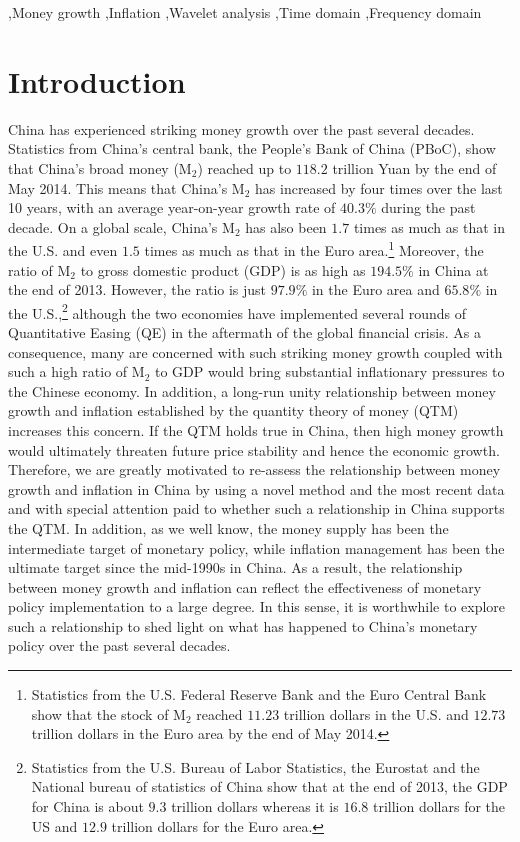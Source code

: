 \documentclass[a4paper,fleqn]{cas-sc}
\begin{document}
\begin{keywords}
    \sep Money growth
    \sep Inflation
    \sep Wavelet analysis
    \sep Time domain
    \sep Frequency domain 
\end{keywords}

\maketitle

\section{Introduction}
China has experienced striking money growth over the past several decades. Statistics from China's central bank, the People's Bank of China (PBoC), show that China's broad money (M$_2$) reached up to $118.2$ trillion Yuan by the end of May 2014. This means that China's M$_2$ has increased by four times over the last 10 years, with an average year-on-year growth rate of $40.3\%$ during the past decade. On a global scale, China's M$_2$ has also been $1.7$ times as much as that in the U.S. and even $1.5$ times as much as that in the Euro area.\footnote{Statistics from the U.S. Federal Reserve Bank and the Euro Central Bank show that the stock of M$_2$ reached $11.23$ trillion dollars in the U.S. and $12.73$ trillion dollars in the Euro area by the end of May 2014.} Moreover, the ratio of M$_2$ to gross domestic product (GDP) is as high as $194.5\%$ in China at the end of 2013. However, the ratio is just $97.9\%$ in the Euro area and $65.8\%$ in the U.S.,\footnote{Statistics from the U.S. Bureau of Labor Statistics, the Eurostat and the National bureau of statistics of China show that at the end of 2013, the GDP for China is about $9.3$ trillion dollars whereas it is $16.8$ trillion dollars for the US and $12.9$ trillion dollars for the Euro area.} although the two economies have implemented several rounds of Quantitative Easing (QE) in the aftermath of the global financial crisis. As a consequence, many are concerned with such striking money growth coupled with such a high ratio of M$_2$ to GDP would bring substantial inflationary pressures to the Chinese economy. In addition, a long-run unity relationship between money growth and inflation established by the quantity theory of money (QTM) increases this concern. If the QTM holds true in China, then high money growth would ultimately threaten future price stability and hence the economic growth. Therefore, we are greatly motivated to re-assess the relationship between money growth and inflation in China by using a novel method and the most recent data and with special attention paid to whether such a relationship in China supports the QTM. In addition, as we well know, the money supply has been the intermediate target of monetary policy, while inflation management has been the ultimate target since the mid-1990s in China. As a result, the relationship between money growth and inflation can reflect the effectiveness of monetary policy implementation to a large degree. In this sense, it is worthwhile to explore such a relationship to shed light on what has happened to China's monetary policy over the past several decades.
\end{document}
